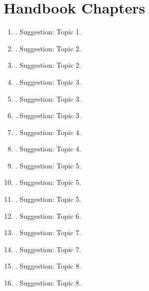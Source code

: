 \documentclass[12pt]{article}
\begin{document}
\section{Handbook Chapters}
\begin{enumerate}
\item \citet{oecd2011divided}. Suggestion: Topic 1.
\item \citet{heckman2006earnings}. Suggestion: Topic 2.
\item \citet{acemoglu2011skills}. Suggestion: Topic 2.
\item \citet{rogerson2011search}. Suggestion: Topic 3.
\item \citet{rebitzer2011extrinsic}. Suggestion: Topic 3.
\item \citet{meghir2011earnings}. Suggestion: Topic 3.
\item \citet{currie2011human}. Suggestion: Topic 4.
\item \citet{almlund2011perso}. Suggestion: Topic 4.
\item \citet{Bjorklund2011education}. Suggestion: Topic 5.
\item \citet{robson2010evolutionary}. Suggestion: Topic 5.
\item \citet{raquel2010culture}. Suggestion: Topic 5.
\item \citet{sacerdote2010nature}. Suggestion: Topic 6.
\item \citet{cawley2011health}. Suggestion: Topic 7.
\item \citet{currie2000child}. Suggestion: Topic 7.
\item \citet{black2011recent}. Suggestion: Topic 8.
\item \citet{piketty2000theories}. Suggestion: Topic 8.



\end{enumerate}




\end{document}
